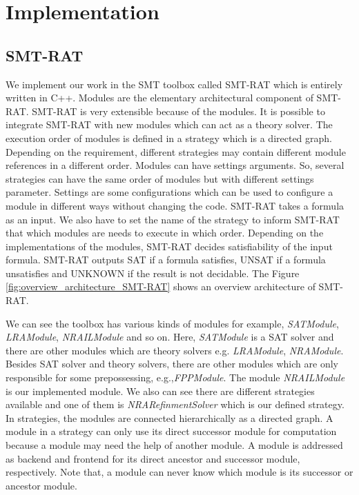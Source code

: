 \chapter{Implementation}
\label{chap:implementation}

\section{SMT-RAT}
\label{sec:smt-rat}
We implement our work in the SMT toolbox called SMT-RAT which is entirely written in C++.
Modules are the elementary architectural component of SMT-RAT.
SMT-RAT is very extensible because of the modules.
It is possible to integrate SMT-RAT with new modules which can act as a theory solver.
The execution order of modules is defined in a strategy which is a directed graph.
Depending on the requirement, different strategies may contain different module references in a different order.
Modules can have settings arguments.
So, several strategies can have the same order of modules but with different settings parameter.
Settings are some configurations which can be used to configure a module in different ways without changing the code.
SMT-RAT takes a formula as an input.
We also have to set the name of the strategy to inform SMT-RAT that which modules are needs to execute in which order.
Depending on the implementations of the modules, SMT-RAT decides satisfiability of the input formula.
SMT-RAT outputs SAT if a formula satisfies, UNSAT if a formula unsatisfies and UNKNOWN if the result is not decidable.
The Figure \ref{fig:overview_architecture_SMT-RAT} shows an overview architecture of SMT-RAT.\newline

\noindent We can see the toolbox has various kinds of modules for example, \textit{SATModule}, \textit{LRAModule}, \textit{NRAILModule} and so on.
Here, \textit{SATModule} is a SAT solver and there are other modules which are theory solvers e.g. \textit{LRAModule}, \textit{NRAModule}.
Besides SAT solver and theory solvers, there are other modules which are only responsible for some prepossessing, e.g.,\textit{FPPModule}.
The module \textit{NRAILModule} is our implemented module.
We also can see there are different strategies available and one of them is \textit{NRARefinmentSolver} which is our defined strategy.
In strategies, the modules are connected hierarchically as a directed graph.
A module in a strategy can only use its direct successor module for computation because a module may need the help of another module.
A module is addressed as backend and frontend for its direct ancestor and successor module, respectively.
Note that, a module can never know which module is its successor or ancestor module.\newline

